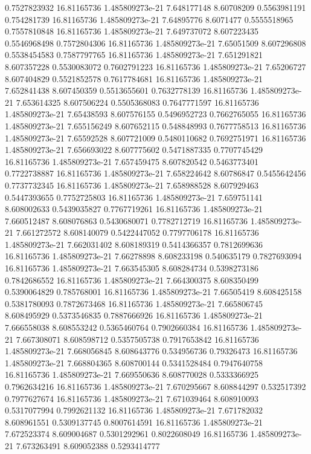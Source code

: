 {0.7527823932 16.81165736 1.485809273e-21 7.648177148 8.60708209 0.5563981191
0.754281739 16.81165736 1.485809273e-21 7.64895776 8.6071477 0.5555518965
0.7557810848 16.81165736 1.485809273e-21 7.649737072 8.607223435 0.5546968498
0.7572804306 16.81165736 1.485809273e-21 7.65051509 8.607296808 0.5538454583
0.7587797765 16.81165736 1.485809273e-21 7.651291821 8.607357228 0.5530083072
0.7602791223 16.81165736 1.485809273e-21 7.65206727 8.607404829 0.5521852578
0.7617784681 16.81165736 1.485809273e-21 7.652841438 8.607450359 0.5513655601
0.7632778139 16.81165736 1.485809273e-21 7.653614325 8.607506224 0.5505368083
0.7647771597 16.81165736 1.485809273e-21 7.65438593 8.607576155 0.5496952723
0.7662765055 16.81165736 1.485809273e-21 7.655156249 8.607652115 0.548848993
0.7677758513 16.81165736 1.485809273e-21 7.65592528 8.607721009 0.5480110682
0.7692751971 16.81165736 1.485809273e-21 7.656693022 8.607775602 0.5471887335
0.7707745429 16.81165736 1.485809273e-21 7.657459475 8.607820542 0.5463773401
0.7722738887 16.81165736 1.485809273e-21 7.658224642 8.60786847 0.5455642456
0.7737732345 16.81165736 1.485809273e-21 7.658988528 8.607929463 0.5447393655
0.7752725803 16.81165736 1.485809273e-21 7.659751141 8.608002633 0.5439035827
0.7767719261 16.81165736 1.485809273e-21 7.660512487 8.608076863 0.5430680071
0.7782712719 16.81165736 1.485809273e-21 7.661272572 8.608140079 0.5422447052
0.7797706178 16.81165736 1.485809273e-21 7.662031402 8.608189319 0.5414366357
0.7812699636 16.81165736 1.485809273e-21 7.66278898 8.608233198 0.540635179
0.7827693094 16.81165736 1.485809273e-21 7.663545305 8.608284734 0.5398273186
0.7842686552 16.81165736 1.485809273e-21 7.664300375 8.608350499 0.5390064829
0.785768001 16.81165736 1.485809273e-21 7.66505419 8.608425158 0.5381780093
0.7872673468 16.81165736 1.485809273e-21 7.665806745 8.608495929 0.5373546835
0.7887666926 16.81165736 1.485809273e-21 7.666558038 8.608553242 0.5365460764
0.7902660384 16.81165736 1.485809273e-21 7.667308071 8.608598712 0.5357505738
0.7917653842 16.81165736 1.485809273e-21 7.668056845 8.608643776 0.534956736
0.79326473 16.81165736 1.485809273e-21 7.668804365 8.608700144 0.5341528484
0.7947640758 16.81165736 1.485809273e-21 7.669550636 8.608770028 0.5333366925
0.7962634216 16.81165736 1.485809273e-21 7.670295667 8.608844297 0.532517392
0.7977627674 16.81165736 1.485809273e-21 7.671039464 8.608910093 0.5317077994
0.7992621132 16.81165736 1.485809273e-21 7.671782032 8.608961551 0.5309137745
0.8007614591 16.81165736 1.485809273e-21 7.672523374 8.609004687 0.5301292961
0.8022608049 16.81165736 1.485809273e-21 7.673263491 8.609052388 0.5293414777
}
